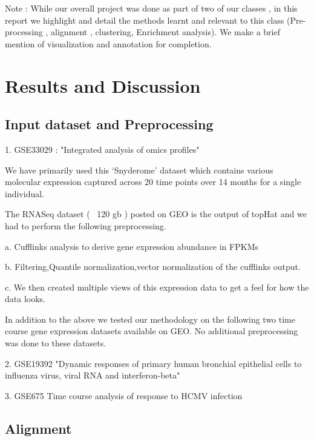 \documentclass[aps,prd,final,onecolumn,a4paper,10pt]{revtex4}
\begin{document}
  Note : While our overall project was done as part of two of our classes , in this report we highlight and detail the methods learnt and relevant to this class (Pre-processing , alignment , clustering, Enrichment analysis). We make a brief mention of visualization and annotation for completion.

\section{Results and Discussion}
\subsection{Input dataset and Preprocessing}
\begin{description}
 \item 1. GSE33029 : "Integrated analysis of omics profiles"
 
 We have primarily used this ‘Snyderome’ dataset which contains various molecular expression captured across 20 time points over 14 months for a single individual.

The RNASeq dataset ( ~120 gb ) posted on GEO is the output of topHat and we had to perform the following preprocessing.
\begin{description}
 \item a. Cufflinks analysis to derive gene expression abundance in FPKMs
 \item b. Filtering,Quantile normalization,vector normalization of the cufflinks output.
 \item c. We then created multiple views of this expression data to get a feel for how the
		data looks.
\end{description}


In addition to the above we tested our methodology on the following two time course gene expression datasets available on GEO. No additional preprocessing was done to these datasets.

 \item 2. GSE19392 "Dynamic responses of primary human bronchial epithelial cells to influenza virus, viral RNA and interferon-beta"
 \item 3. GSE675 Time course analysis of response to HCMV infection
\end{description}


\subsection{Alignment}
\end{document}
